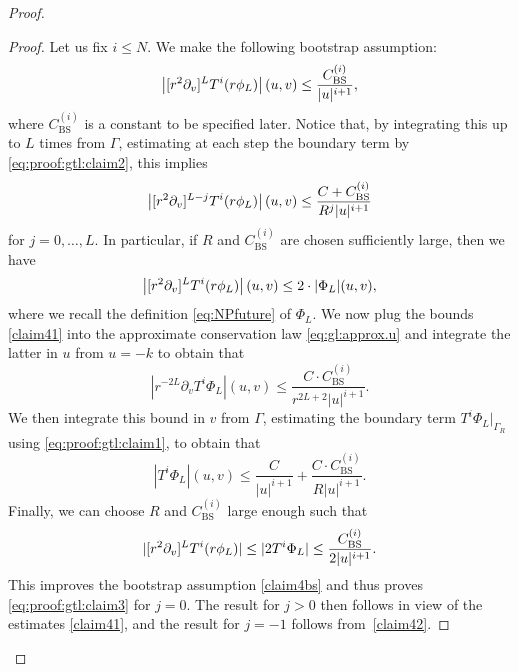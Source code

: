 \documentclass[11pt,english]{article}
\numberwithin{equation}{section}
\theoremstyle{remark}
\theoremstyle{plain}
\theoremstyle{remark}
\newcommand{\pv}{\partial_v}
\renewcommand{\(}{\left(}
\renewcommand{\)}{\right)}
\begin{document}
\begin{proof}
\begin{proof}
Let us fix $i\leq N$. We make the following bootstrap assumption:
\newcommand{\bs}{C_{\mathrm{BS}}^{(i)}}
\begin{equation}
\left|\pvx{L}T^i(r\phi_L)\right|(u,v)\leq \frac{\bs}{|u|^{i+1}},\label{claim4bs}
\end{equation}
where $\bs$ is a constant to be specified later.
Notice that, by integrating this up to $L$ times from $\Gamma$, estimating at each step the boundary term by \eqref{eq:proof:gtl:claim2}, this implies
\begin{equation}
\left|\pvx{L-j}T^i(r\phi_L)\right|(u,v)\leq \frac{C+\bs}{R^j|u|^{i+1}}\label{claim41}
\end{equation}
for $j=0,\dots, L$. In particular, if $R$  and $\bs$ are chosen sufficiently large, then we have
\begin{equation}
\left|\pvx{L}T^i(r\phi_L)\right|(u,v)\leq 2\cdot|\Phi_L|(u,v),
\end{equation}
where we recall the definition \eqref{eq:NPfuture} of $\Phi_L$.
We now plug the bounds \eqref{claim41} into the approximate conservation law \eqref{eq:gl:approx.u} and integrate the latter in $u$ from $u=-k$ to obtain that
\begin{equation}
\left|r^{-2L}\pv T^i\Phi_L\right|(u,v)\leq \frac{C\cdot\bs}{r^{2L+2}|u|^{i+1}}.\label{claim42}
\end{equation}
We then integrate this bound in $v$ from $\Gamma$, estimating the boundary term $T^i\Phi_L|_{\Gamma_R}$ using \eqref{eq:proof:gtl:claim1}, to obtain that
\begin{equation}
\left|T^i\Phi_L\right|(u,v)\leq \frac{C}{|u|^{i+1}}+\frac{C\cdot\bs}{R|u|^{i+1}}.
\end{equation} 
Finally, we can choose $R$ and $\bs$ large enough such that 
\begin{equation}
|\pvx{L}T^i(r\phi_L)|\leq|2T^i\Phi_L |\leq\frac{\bs}{2|u|^{i+1}}.
\end{equation}
This improves the bootstrap assumption \eqref{claim4bs} and thus proves \eqref{eq:proof:gtl:claim3} for $j=0$. The result for $j>0$ then follows in view of the estimates \eqref{claim41}, and the result for $j=-1$ follows from~\eqref{claim42}.
\end{proof}

\end{proof}
\end{document}
